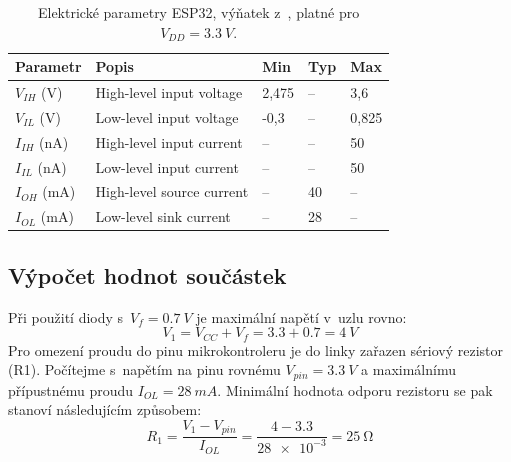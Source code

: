         \begin{table}[h]
            \centering
            \caption{Elektrické parametry ESP32, výňatek z~\cite{esp32-wroom-32e-datasheet}, platné pro \(V_{DD} =\qty{3,3}{V}\).}
            \label{tab:esp32-elektricke-parametry}
            \begin{tabular}{|l|l|l|l|l|}
            \hline
            \textbf{Parametr} & \textbf{Popis} & \textbf{Min} & \textbf{Typ} & \textbf{Max} \\ \hline\hline
            \(V_{IH}\) (V)   & High-level input voltage   & 2,475  & --  & 3,6          \\ \hline
            \(V_{IL}\) (V)   & Low-level input voltage    & -0,3 & --   & 0,825   \\ \hline
            \(I_{IH}\) (nA)  & High-level input current   & --   & --   & 50           \\ \hline
            \(I_{IL}\) (nA)  & Low-level input current    & --   & --   & 50           \\ \hline
            \(I_{OH}\) (mA)  & High-level source current  & --   & 40   & --           \\ \hline
            \(I_{OL}\) (mA)  & Low-level sink current     & --   & 28   & --           \\ \hline
            \end{tabular}
        \end{table}

        \newpage
        \subsection{Výpočet hodnot součástek}
            Při použití diody s~\(V_{f} =\qty{0.7}{V}\) je maximální napětí v~uzlu  rovno:
            \begin{equation}
                V_{1} =V_{CC} +V_{f} = \num{3,3}+\num{0,7}=\qty{4}{V}
            \end{equation}
            Pro omezení proudu do pinu mikrokontroleru je do linky zařazen sériový rezistor (R1). Počítejme s~napětím na pinu rovnému \(V_{pin} =\qty{3.3}{V}\) a maximálnímu přípustnému proudu \(I_{OL} =\qty{28}{mA}\). Minimální hodnota odporu rezistoru se pak stanoví následujícím způsobem:
            \begin{equation}
                R_{1} =\frac{V_{1}- V_{pin}}{I_{OL} }=\frac{\num{4}-\num{3.3}}{\num{28e-3}}=\qty{25}{\ohm}
            \end{equation}

